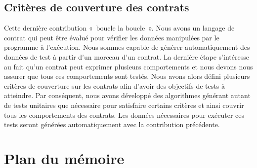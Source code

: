 \subsection{Critères de couverture des contrats}

Cette dernière contribution «~boucle la boucle~». Nous avons un langage de
contrat qui peut être évalué pour vérifier les données manipulées par le
programme à l'exécution. Nous sommes capable de générer automatiquement des
données de test à partir d'un morceau d'un contrat. La dernière étape
s'intéresse au fait qu'un contrat peut exprimer plusieurs comportements et nous
devons nous assurer que tous ces comportements sont testés. Nous avons alors
défini plusieurs critères de couverture sur les contrats afin d'avoir des
objectifs de tests à atteindre. Par conséquent, nous avons développé des
algorithmes générant autant de tests unitaires que nécessaire pour satisfaire
certains critères et ainsi couvrir tous les comportements des contrats. Les
données nécessaires pour exécuter ces tests seront générées automatiquement avec
la contribution précédente.

\section{Plan du mémoire}

